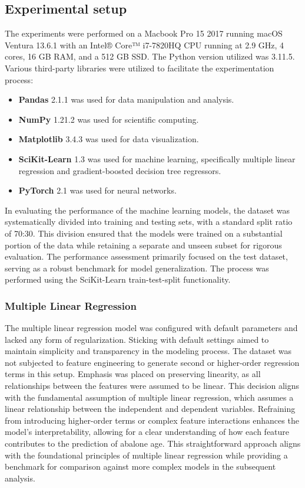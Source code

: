 \documentclass[12pt]{article}
\begin{document}
\subsection{Experimental setup}

The experiments were performed on a Macbook Pro 15 2017 running macOS Ventura 13.6.1 with an Intel® Core™ i7-7820HQ CPU running at 2.9 GHz, 4 cores, 16 GB RAM, and a 512 GB SSD. The Python version utilized was 3.11.5. Various third-party libraries were utilized to facilitate the experimentation process:

\begin{itemize}
	\item \textbf{Pandas} 2.1.1 \cite{mckinney_data_2010} was used for data manipulation and analysis.
	\item \textbf{NumPy} 1.21.2 \cite{harris_array_2020} was used for scientific computing.
	\item \textbf{Matplotlib} 3.4.3 \cite{hunter_matplotlib_2007} was used for data visualization.
	\item \textbf{SciKit-Learn} 1.3 \cite{pedregosa_scikit-learn_2011} was used for machine learning, specifically multiple linear regression and gradient-boosted decision tree regressors.
	\item \textbf{PyTorch} 2.1 \cite{paszke_pytorch_2019} was used for neural networks.
\end{itemize}

In evaluating the performance of the machine learning models, the dataset was systematically divided into training and testing sets, with a standard split ratio of 70:30. This division ensured that the models were trained on a substantial portion of the data while retaining a separate and unseen subset for rigorous evaluation. The performance assessment primarily focused on the test dataset, serving as a robust benchmark for model generalization. The process was performed using the SciKit-Learn train-test-split functionality.

\subsubsection{Multiple Linear Regression}

The multiple linear regression model was configured with default parameters and lacked any form of regularization. Sticking with default settings aimed to maintain simplicity and transparency in the modeling process. The dataset was not subjected to feature engineering to generate second or higher-order regression terms in this setup. Emphasis was placed on preserving linearity, as all relationships between the features were assumed to be linear. This decision aligns with the fundamental assumption of multiple linear regression, which assumes a linear relationship between the independent and dependent variables. Refraining from introducing higher-order terms or complex feature interactions enhances the model's interpretability, allowing for a clear understanding of how each feature contributes to the prediction of abalone age. This straightforward approach aligns with the foundational principles of multiple linear regression while providing a benchmark for comparison against more complex models in the subsequent analysis.
\end{document}
